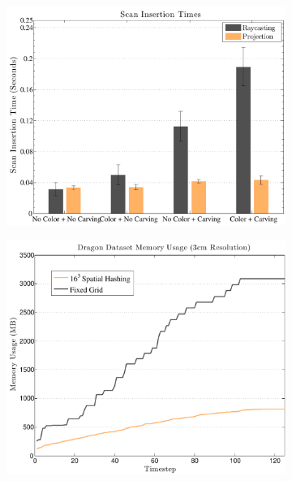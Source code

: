  
 \begin{figure}
  \centering
 \begin{subfigure}{0.75\columnwidth} \centering
\includegraphics[width=1.0\textwidth]{img/timing_data.pdf}
		 \caption{}
		 \label{fig:timing}
	 \end{subfigure} 
 \begin{subfigure}{0.75\columnwidth} \centering
\includegraphics[width=1.0\textwidth]{img/memoryusage.pdf}
		 \caption{} 
		 \label{fig:memory_data}
	 \end{subfigure}  
	  \begin{subfigure}{0.75\columnwidth} \centering

\end{subfigure}
\end{figure}
